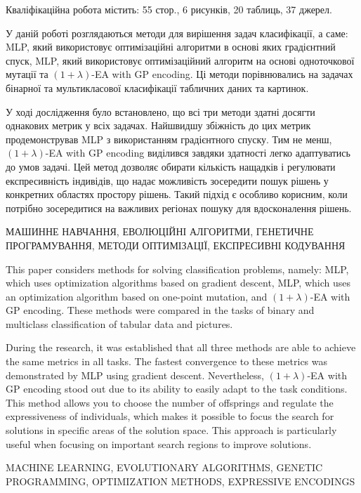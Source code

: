 
\abstractUkr

Кваліфікаційна робота містить: 55 стор., 6 рисунків, 20 таблиць, 37 джерел.

У даній роботі розглядаються методи для вирішення задач класифікації, а саме: MLP, який використовує оптимізаційні алгоритми в основі яких градієнтний спуск, MLP, який використовує оптимізаційний алгоритм на основі одноточкової мутації та $(1+\lambda)$-EA with GP encoding. Ці методи порівнювались на задачах бінарної та мультикласової класифікації табличних даних та картинок.

У ході дослідження було встановлено, що всі три методи здатні досягти однакових метрик у всіх задачах. Найшвидшу збіжність до цих метрик продемонстрував MLP з використанням градієнтного спуску. Тим не менш, $(1+\lambda)$-EA with GP encoding виділився завдяки здатності легко адаптуватись до умов задачі. Цей метод дозволяє обирати кількість нащадків і регулювати експресивність індивідів, що надає можливість зосередити пошук рішень у конкретних областях простору рішень. Такий підхід є особливо корисним, коли потрібно зосередитися на важливих регіонах пошуку для вдосконалення рішень.


\MakeUppercase{МАШИННЕ НАВЧАННЯ, ЕВОЛЮЦІЙНІ АЛГОРИТМИ, ГЕНЕТИЧНЕ ПРОГРАМУВАННЯ, МЕТОДИ ОПТИМІЗАЦІЇ, ЕКСПРЕСИВНІ КОДУВАННЯ}


%

\abstractEng

This paper considers methods for solving classification problems, namely: MLP, which uses optimization algorithms based on gradient descent, MLP, which uses an optimization algorithm based on one-point mutation, and $(1+\lambda)$-EA with GP encoding. These methods were compared in the tasks of binary and multiclass classification of tabular data and pictures.

During the research, it was established that all three methods are able to achieve the same metrics in all tasks. The fastest convergence to these metrics was demonstrated by MLP using gradient descent. Nevertheless, $(1+\lambda)$-EA with GP encoding stood out due to its ability to easily adapt to the task conditions. This method allows you to choose the number of offsprings and regulate the expressiveness of individuals, which makes it possible to focus the search for solutions in specific areas of the solution space. This approach is particularly useful when focusing on important search regions to improve solutions.

\MakeUppercase{MACHINE LEARNING, EVOLUTIONARY ALGORITHMS, GENETIC PROGRAMMING, OPTIMIZATION METHODS, EXPRESSIVE ENCODINGS}

\clearpage